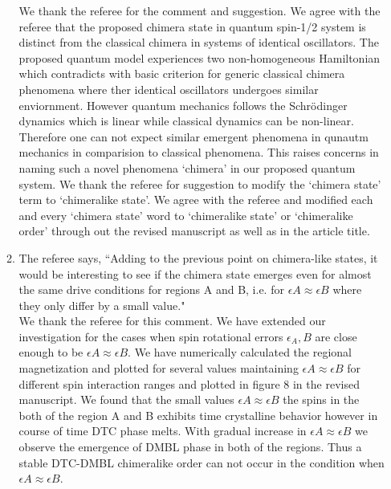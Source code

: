 \documentclass[10pt,
superscriptaddress,
amsmath,amssymb,showkeys,
aps, 
prb,
]{revtex4-2}
\newcommand{\response}[1]{{\color{black}#1}} %
\newcommand{\comment}[1]{{\color{blue}#1}} %
\begin{document}
\begin{enumerate}
\begin{enumerate}
			\response{We thank the referee for the comment and suggestion. We agree with the referee that the proposed chimera state in quantum spin-1/2 system is distinct from the classical chimera in systems of identical oscillators. The proposed quantum model experiences two non-homogeneous Hamiltonian which contradicts with basic criterion for generic classical chimera phenomena where ther identical oscillators undergoes similar enviornment. However quantum mechanics follows the Schr\"{o}dinger dynamics which is linear while classical dynamics can be non-linear. Therefore one can not expect similar emergent phenomena in qunautm mechanics in comparision to classical phenomena. This raises concerns in naming such a novel phenomena `chimera' in our proposed quantum system. We thank the referee for suggestion to modify the `chimera state' term to `chimeralike state'. We agree with the referee and modified each and every `chimera state' word to `chimeralike state' or `chimeralike order' through out the revised manuscript as well as in the article title.}
		
		\item The referee says, \comment{``Adding to the previous point on chimera-like states, it would be interesting to see if the chimera state emerges even for almost the same drive conditions for regions A and B, i.e. for $\epsilon A \approx \epsilon B$ where they only differ by a small value."}\\
		
		\response{We thank the referee for this comment. We have extended our investigation for the cases when spin rotational errors $\epsilon_A,B$ are close enough to be $\epsilon A \approx \epsilon B$. We have numerically calculated the regional magnetization and plotted for several values maintaining $\epsilon A \approx \epsilon B$ for different spin interaction ranges and plotted in figure 8 in the revised manuscript.
		We found that the small values $\epsilon A \approx \epsilon B$ the spins in the both of the region A and B exhibits time crystalline behavior however in course of time DTC phase melts. With gradual increase in $\epsilon A \approx \epsilon B$ we observe the emergence of DMBL phase in both of the regions. Thus a stable DTC-DMBL chimeralike order can not occur in the condition when $\epsilon A \approx \epsilon B$.} \\
	

\end{enumerate}
\end{enumerate}
\end{document}
